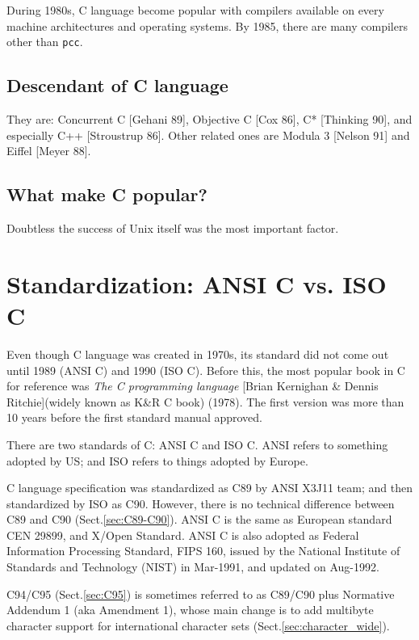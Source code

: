 During 1980s, C language become popular with compilers available on every
machine architectures and operating systems. By 1985, there are many compilers
other than \verb!pcc!.

\subsection{Descendant of C language}

They are: Concurrent C [Gehani 89], Objective C [Cox 86], C* [Thinking 90], and
especially C++ [Stroustrup 86]. Other related ones are  Modula 3 [Nelson 91] and
Eiffel [Meyer 88].

\subsection{What make C popular?}

Doubtless the success of Unix itself was the most important factor. 

\section{Standardization: ANSI C vs. ISO C}
\label{sec:ANSI-C}

Even though C language was created in 1970s, its standard did not come out until
1989 (ANSI C) and 1990 (ISO C). Before this, the most popular book in C for
reference was {\it The C programming language} [Brian Kernighan \& Dennis
Ritchie](widely known as K\&R C book) (1978). The first version was more than 10
years before the first standard manual approved.

There are two standards of C: ANSI C and ISO C.
ANSI refers to something adopted by US; and ISO refers to things adopted by
Europe.

C language specification was standardized as C89 by ANSI X3J11 team; and then
standardized by ISO as C90. However, there is no technical difference between
C89 and C90 (Sect.\ref{sec:C89-C90}). ANSI C is the same as European standard
CEN 29899, and X/Open Standard. ANSI C is also adopted as Federal Information
Processing Standard, FIPS 160, issued by the National Institute of Standards and
Technology (NIST) in Mar-1991, and updated on Aug-1992.

C94/C95 (Sect.\ref{sec:C95}) is sometimes referred to as C89/C90 plus Normative
Addendum 1 (aka Amendment 1), whose main change is to add multibyte character
support for international character sets (Sect.\ref{sec:character_wide}).

